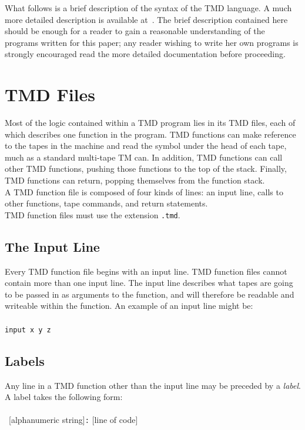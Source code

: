 \documentclass[11pt]{article}
\begin{document}
What follows is a brief description of the syntax of the TMD language. A much more detailed description is available at~\cite{github}. The brief description contained here should be enough for a reader to gain a reasonable understanding of the programs written for this paper; any reader wishing to write her own programs is strongly encouraged read the more detailed documentation before proceeding.

\section{TMD Files}

Most of the logic contained within a TMD program lies in its TMD files, each of which describes one function in the program. TMD functions can make reference to the tapes in the machine and read the symbol under the head of each tape, much as a standard multi-tape TM can. In addition, TMD functions can call other TMD functions, pushing those functions to the top of the stack. Finally, TMD functions can return, popping themselves from the function stack. \\

A TMD function file is composed of four kinds of lines: an input line, calls to other functions, tape commands, and return statements. \\

TMD function files must use the extension \texttt{.tmd}.

\subsection{The Input Line}

Every TMD function file begins with an input line. TMD function files cannot contain more than one input line. The input line describes what tapes are going to be passed in as arguments to the function, and will therefore be readable and writeable within the function. An example of an input line might be: \\ \\
\texttt{input x y z}

\subsection{Labels}

Any line in a TMD function other than the input line may be preceded by a \emph{label}. A label takes the following form: \\ \\
~[alphanumeric string]\texttt{:} [line of code] \\
\end{document}
